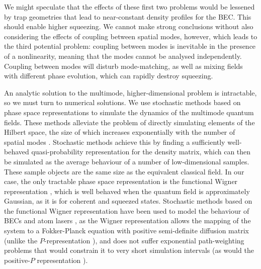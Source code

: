 \documentclass{iopart}
\begin{document}
We might speculate that the effects of these first two problems would be lessened by trap geometries that lead to near-constant density profiles for the BEC.  This should enable higher squeezing.  We cannot make strong conclusions without also considering the effects of coupling between spatial modes, however, which leads to the third potential problem: coupling between modes is inevitable in the presence of a nonlinearity, meaning that the modes cannot be analysed independently. Coupling between modes will disturb mode-matching, as well as mixing fields with different phase evolution, which can rapidly destroy squeezing.  

An analytic solution to the multimode, higher-dimensional problem is intractable, so we must turn to numerical solutions.  We use stochastic methods based on phase space representations to simulate the dynamics of the multimode quantum fields.  These methods alleviate the problem of directly simulating elements of the Hilbert space, the size of which increases exponentially with the number of spatial modes \cite{gardiner1991, steelET1998}.  Stochastic methods achieve this by finding a sufficiently well-behaved quasi-probability representation for the density matrix, which can then be simulated as the average behaviour of a number of low-dimensional samples.  These sample objects are the same size as the equivalent classical field.  In our case, the only tractable phase space representation is the functional Wigner representation \cite{steelET1998}, which is well behaved when the quantum field is approximately Gaussian, as it is for coherent and squeezed states.  Stochastic methods based on the functional Wigner representation have been used to model the behaviour of BECs and atom lasers \cite{johnssonET2007,dallET2009,dennisET2010}, as the Wigner representation allows the mapping of the system to a Fokker-Planck equation with positive semi-definite diffusion matrix (unlike the $P$-representation \cite{gardiner1991}), and does not suffer exponential path-weighting problems that would constrain it to very short simulation intervals (as would the positive-$P$ representation \cite{gardiner1991}).
\end{document}
